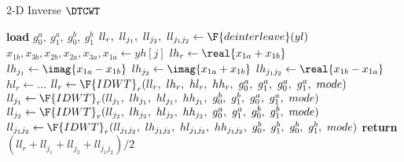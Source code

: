\begin{algorithm}[tb]
\caption{2-D Inverse $\DTCWT$}\label{alg:ch3:idtcwt}
\begin{algorithmic}[1]
\State \textbf{load} $g_0^a,\ g_1^a,\ g_0^b,\ g_1^b$ 
\State $ll_{r},\ ll_{j_1},\ ll_{j_2},\ ll_{j_1j_2} \gets \F{deinterleave}(yl)$
\State $x_{1b},x_{3b}, x_{2b}, x_{2a}, x_{3a}, x_{1a} \gets yh[j] $
\State $lh_{r} \gets \real{x_{1a} + x_{1b}}$
\State $lh_{j_1} \gets \imag{x_{1a} - x_{1b}}$
\State $lh_{j_2} \gets \imag{x_{1a} + x_{1b}}$
\State $lh_{j_1j_2} \gets \real{x_{1b} - x_{1a}}$
\State $hl_{r} \gets \ldots $ 
\State $ll_{r} \gets \F{IDWT}_r(ll_{r},\ lh_{r},\ hl_{r},\ hh_{r},\ g_0^a,\ g_1^a,\ g_0^a,\ g_1^a,\ mode)$
\State $ll_{j_1} \gets \F{IDWT}_r(ll_{j_1},\ lh_{j_1},\ hl_{j_1},\ hh_{j_1},\ g_0^b,\ g_1^b,\ g_0^a,\ g_1^a,\ mode)$
\State $ll_{j_2} \gets \F{IDWT}_r(ll_{j_2},\ lh_{j_2},\ hl_{j_2},\ hh_{j_2},\ g_0^a,\ g_1^a,\ g_0^b,\ g_1^b,\ mode)$
\State $ll_{j_1j_2} \gets \F{IDWT}_r(ll_{j_1j_2},\ lh_{j_1j_2},\ hl_{j_1j_2},\ hh_{j_1j_2},\ g_0^b,\ g_1^b,\ g_0^b,\ g_1^b,\ mode)$
\EndFor
\State \textbf{return} $\left(ll_{r} + ll_{j_1} + ll_{j_2} + ll_{j_1j_2}\right)/2$
\EndFunction
\end{algorithmic}
\end{algorithm}

